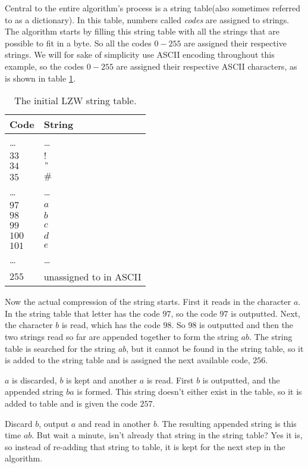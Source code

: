 Central to the entire algorithm's process is a string table(also
sometimes referred to as a dictionary). In this table, numbers called
\textit{codes} are assigned to strings. The algorithm starts by
filling this string table with all the strings that are possible to
fit in a byte. So all the codes $0-255$ are assigned their respective
strings. We will for sake of simplicity use ASCII encoding throughout
this example, so the codes $0-255$ are assigned their respective ASCII
characters, as is shown in table \ref{tab:str-tab-ascii}.

\begin{table}
  \centering
  \begin{tabular}{ll}
    \toprule
    Code & String\\
    \midrule
    \dots & \dots \\
    $33$ & $!$ \\
    $34$ & $"$ \\
    $35$ & $\#$ \\
    \dots & \dots \\
    $97$ & $a$ \\
    $98$ & $b$ \\
    $99$ & $c$ \\
    $100$ & $d$ \\
    $101$ & $e$ \\
    \dots & \dots \\
    $255$ & unassigned to in ASCII \\
    \bottomrule
  \end{tabular}
  \caption{The initial LZW string table.}
  \label{tab:str-tab-ascii}
\end{table}

Now the actual compression of the string starts. First it reads in the
character $a$. In the string table that letter has the code $97$,
so the code $97$ is outputted. Next, the character $b$ is read,
which has the code $98$. So $98$ is outputted and then the two strings
read so far are appended together to form the string $ab$. The
string table is searched for the string $ab$, but it cannot be
found in the string table, so it is added to the string table and is
assigned the next available code, $256$.

$a$ is discarded, $b$ is kept and another $a$ is
read. First $b$ is outputted, and the appended string
$ba$ is formed. This string doesn't either exist in the table,
 so it is added to table and is given the code $257$.

 Discard $b$, output $a$ and read in another $b$. The
 resulting appended string is this time $ab$. But wait a minute,
 isn't already that string in the string table? Yes it is, so instead
 of re-adding that string to table, it is kept for the next step in
 the algorithm.

